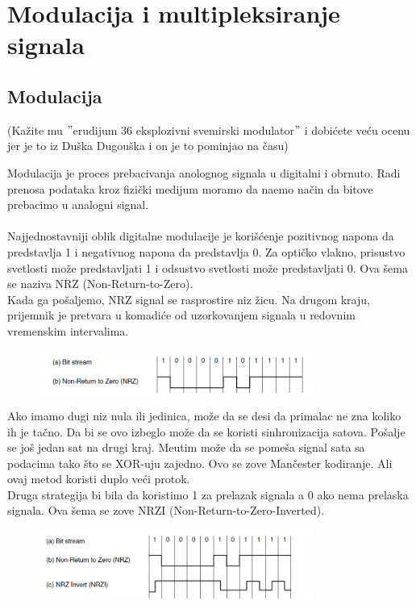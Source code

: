 \documentclass{article} %
\begin{document}
\section{Modulacija i multipleksiranje signala}
\subsection{Modulacija}

(Ka\v zite mu $"$erudijum 36 eksplozivni svemirski modulator$"$ i dobi\' cete ve\' cu ocenu jer je to iz Du\v ska Dugou\v ska i on je to pominjao na \v casu)

Modulacija je proces prebacivanja anolognog signala u digitalni i obrnuto. Radi prenosa podataka kroz fizi\v cki medijum moramo da na\dj  emo na\v cin da bitove prebacimo u analogni signal.
\\
\\
Najjednostavniji oblik digitalne modulacije je kori\v s\' cenje pozitivnog napona da predstavlja 1 i negativnog napona da predstavlja 0. Za opti\v cko vlakno, prisustvo svetlosti mo\v ze predstavljati 1 i odsustvo svetlosti mo\v ze predstavljati 0. Ova \v sema se naziva NRZ (Non-Return-to-Zero).
\\
Kada ga po\v saljemo, NRZ signal se rasprostire niz \v zicu. Na drugom kraju, prijemnik je pretvara u komadi\' ce od uzorkovanjem signala u redovnim vremenskim intervalima.

\begin{figure}[H]
	\centering
	\includegraphics[width=0.8\textwidth]{slike-aplikativniSloj/nrz.png}
\end{figure}

Ako imamo dugi niz nula ili jedinica, mo\v ze da se desi da primalac ne zna koliko ih je ta\v cno. Da bi se ovo izbeglo mo\v ze da se koristi sinhronizacija satova. Po\v salje se jo\v s jedan sat na drugi kraj. Me\dj  utim mo\v ze da se pome\v sa signal sata sa podacima tako \v sto se XOR-uju zajedno. Ovo se zove Man\v cester kodiranje. Ali ovaj metod koristi duplo ve\' ci protok.
\\
Druga strategija bi bila da koristimo 1 za prelazak signala a 0 ako nema prelaska signala. Ova \v sema se zove NRZI (Non-Return-to-Zero-Inverted).


\begin{figure}[H]
	\centering
	\includegraphics[width=0.8\textwidth]{slike-aplikativniSloj/nrzi.png}
\end{figure}
\end{document}
